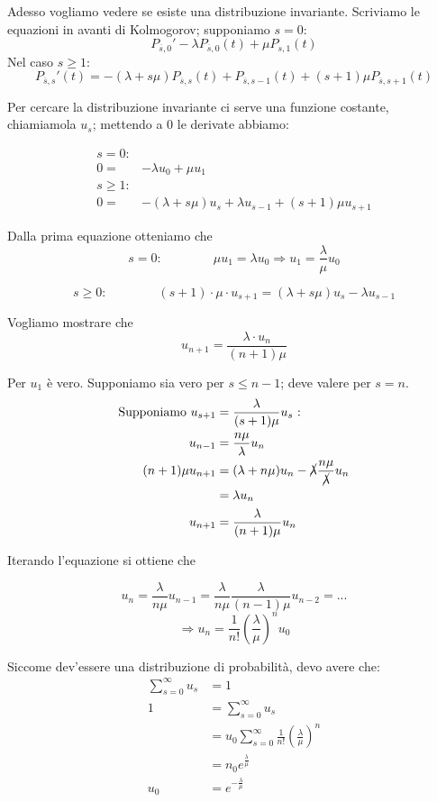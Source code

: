 \documentclass[a4paper,12pt]{book}
\begin{document}
Adesso vogliamo vedere se esiste una distribuzione invariante. Scriviamo le equazioni in avanti di Kolmogorov; supponiamo $ s=0 $:
$$ P_{\overline{s},0}' -\lambda P_{\overline{s},0}(t) + \mu P_{s,1}(t) $$
Nel caso $ s \ge 1 $:
$$ P_{\overline{s},s}'(t) = -(\lambda + s\mu) P_{\overline{s},s}(t) + P_{\overline{s},s-1}(t) + (s+1)\mu P_{\overline{s},s+1}(t) $$


Per cercare la distribuzione invariante ci serve una funzione costante, chiamiamola $ u_s $; mettendo a 0 le derivate abbiamo:

\begin{align*}
	s = 0: \\
	0 = & -\lambda u_0 + \mu u_1 \\ 
	s \ge 1: \\
	0 = & -(\lambda + s\mu)  u_s + \lambda u_{s-1} + (s+1) \mu u_{s+1}
\end{align*}


Dalla prima equazione otteniamo che 
$$ s = 0: \qquad \qquad \mu u_1 = \lambda u_0 \Rightarrow u_1 = \frac{\lambda}{\mu}u_0$$ 
 
$$ s \ge 0: \qquad \qquad(s+1)\cdot\mu \cdot u_{s+1} = (\lambda + s\mu) u_s - \lambda u_{s-1} $$

Vogliamo mostrare che
$$ u_{n+1} = \frac{\lambda \cdot u_n}{(n+1)\mu} $$

Per $ u_1 $ è vero. Supponiamo sia vero per $ s \le n-1 $; deve valere per $ s=n $. 
\begin{align*}
		\textnormal {Supponiamo  }u_{s+1} & = \frac{\lambda}{(s+1)\mu}u_s \textnormal{ :} \\
		u_{n-1} & = \frac{n\mu}{\lambda}u_n \\
		(n+1)\mu u_{n+1} & = (\lambda + n\mu)u_n -\cancel{\lambda}\frac{n\mu}{\cancel{\lambda}}u_n  \\
		& = \lambda u_n \\
		u_{n+1} & = \frac{\lambda}{(n+1)\mu}u_n
\end{align*}

Iterando l'equazione si ottiene che 

$$ u_n = \frac{\lambda}{n\mu} u_{n-1} = \frac{\lambda}{n\mu}\frac{\lambda}{(n-1)\mu} u_{n-2} = ... 
$$
$$ \Rightarrow u_n = \frac{1}{n!}\left(\frac{\lambda}{\mu}\right)^n u_0 $$

Siccome dev'essere una distribuzione di probabilità, devo avere che:
\begin{align*}
	\sum_{s=0}^\infty u_s & = 1 \\
	1 & = \sum_{s=0}^{\infty} u_s \\
	& = u_0 \sum_{s=0}^{\infty} \frac{1}{n!} (\frac{\lambda}{\mu})^n \\
	& = n_0 e^{\frac{\lambda}{\mu}} \\
	u_0 & = e^{-\frac{\lambda}{\mu}}
\end{align*}
\end{document}
